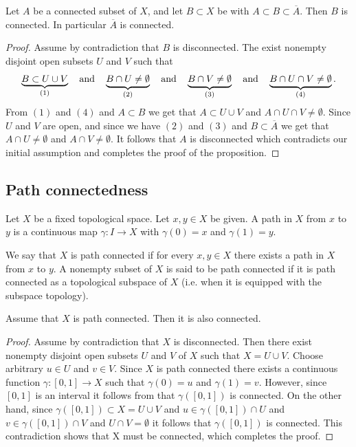 \documentclass[11pt,a4paper]{article}
\begin{document}
\begin{proposition}
  Let $A$ be a connected subset of $X$, and let $B \subset X$ be with
  $A \subset B \subset \overline A$.
  Then $B$ is connected.
  In particular $\overline A$ is connected.
\end{proposition}
\begin{proof}
  Assume by contradiction that $B$ is disconnected.
  The exist nonempty disjoint open subsets $U$ and $V$ such that
  \[
    \underbrace{B \subset U \cup V}_{(1)} \quad \text{and} \quad
    \underbrace{B \cap U \neq \emptyset}_{(2)} \quad \text{and} \quad
    \underbrace{B \cap V \neq \emptyset}_{(3)} \quad \text{and} \quad
    \underbrace{B \cap U \cap V \neq \emptyset}_{(4)}.
  \]
  From $(1)$ and $(4)$ and $A \subset B$ we get that
  $A \subset U \cup V$ and $A \cap U \cap V \neq \emptyset$.
  Since $U$ and $V$ are open, and since we have $(2)$ and $(3)$ and
  $B \subset \overline A$ we get that $A \cap U \neq \emptyset$ and
  $A \cap V \neq \emptyset$.
  It follows that $A$ is disconnected which contradicts our initial
  assumption and completes the proof of the proposition.
\end{proof}

\subsection{Path connectedness}

\begin{definition}[Path]
  Let $X$ be a fixed topological space.
  Let $x, y \in X$ be given.
  A path in $X$ from $x$ to $y$ is a continuous map
  $\gamma \colon I \to X$ with $\gamma(0) = x$ and $\gamma(1) = y$.
\end{definition}

\begin{definition}
  We say that $X$ is path connected if for every $x, y \in X$ there exists
  a path in $X$ from $x$ to $y$.
  A nonempty subset of $X$ is said to be path connected if it is
  path connected as a topological subspace of $X$
  (i.e. when it is equipped with the subspace topology).
\end{definition}

\begin{proposition}
  Assume that $X$ is path connected. Then it is also connected.
\end{proposition}
\begin{proof}
  Assume by contradiction that $X$ is disconnected.
  Then there exist nonempty disjoint open subsets $U$ and $V$ of $X$
  such that $X = U \cup V$.
  Choose arbitrary $u \in U$ and $v \in V$.
  Since $X$ is path connected there exists a continuous function
  $\gamma \colon [0,1] \to X$ such that $\gamma(0) = u$ and $\gamma(1) = v$.
  However, since $[0,1]$ is an interval it follows from
   that $\gamma([0,1])$ is connected.
  On the other hand, since $\gamma([0,1]) \subset X = U \cup V$
  and $u \in \gamma([0,1]) \cap U$ and $v \in \gamma([0,1]) \cap V$
  and $U \cap V = \emptyset$ it follows that $\gamma([0,1])$ is connected.
  This contradiction shows that X must be connected,
  which completes the proof.
\end{proof}
\end{document}
